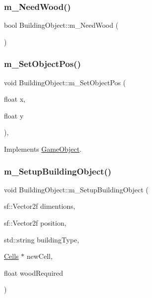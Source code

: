 \mbox{\label{class_building_object_aee720b050f8fed6e7f8cf773df7b0a3d}} 
\subsubsection{\texorpdfstring{m\+\_\+\+Need\+Wood()}{m\_NeedWood()}}
{\footnotesize\ttfamily bool Building\+Object\+::m\+\_\+\+Need\+Wood (\begin{DoxyParamCaption}{ }\end{DoxyParamCaption})}

\mbox{\label{class_building_object_aa6239662e4277d8e1933f9c8fd487511}} 
\subsubsection{\texorpdfstring{m\+\_\+\+Set\+Object\+Pos()}{m\_SetObjectPos()}}
{\footnotesize\ttfamily void Building\+Object\+::m\+\_\+\+Set\+Object\+Pos (\begin{DoxyParamCaption}\item[{float}]{x,  }\item[{float}]{y }\end{DoxyParamCaption})\hspace{0.3cm}{\ttfamily [override]}, {\ttfamily [virtual]}}



Implements \mbox{\hyperlink{class_game_object_ad1f8ea8eb3673b1af8215bf92cdc0df8}{Game\+Object}}.

\mbox{\label{class_building_object_a77221935bdcf6ef2cad7cd80fb877da8}} 
\subsubsection{\texorpdfstring{m\+\_\+\+Setup\+Building\+Object()}{m\_SetupBuildingObject()}}
{\footnotesize\ttfamily void Building\+Object\+::m\+\_\+\+Setup\+Building\+Object (\begin{DoxyParamCaption}\item[{sf\+::\+Vector2f}]{dimentions,  }\item[{sf\+::\+Vector2f}]{position,  }\item[{std\+::string}]{building\+Type,  }\item[{\mbox{\hyperlink{class_cells}{Cells}} $\ast$}]{new\+Cell,  }\item[{float}]{wood\+Required }\end{DoxyParamCaption})}

